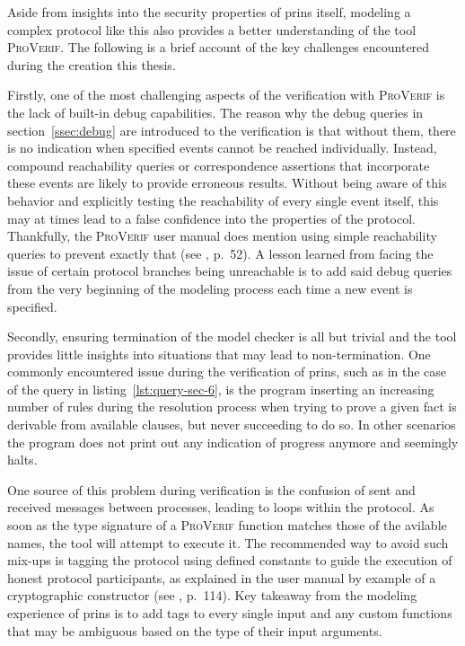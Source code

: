 Aside from insights into the security properties of \gls{prins} itself, modeling a complex protocol like this also provides a better understanding of the tool \textsc{ProVerif}.
The following is a brief account of the key challenges encountered during the creation this thesis.\medskip

Firstly, one of the most challenging aspects of the verification with \textsc{ProVerif} is the lack of built-in debug capabilities.
The reason why the debug queries in section~\ref{ssec:debug} are introduced to the verification is that without them, there is no indication when specified events cannot be reached individually.
Instead, compound reachability queries or correspondence assertions that incorporate these events are likely to provide erroneous results.
Without being aware of this behavior and explicitly testing the reachability of every single event itself, this may at times lead to a false confidence into the properties of the protocol.
Thankfully, the \textsc{ProVerif} user manual does mention using simple reachability queries to prevent exactly that (see \cite{blanchet2020proverif}, p.~52).
A lesson learned from facing the issue of certain protocol branches being unreachable is to add said debug queries from the very beginning of the modeling process each time a new event is specified.\medskip

Secondly, ensuring termination of the model checker is all but trivial and the tool provides little insights into situations that may lead to non-termination.
One commonly encountered issue during the verification of \gls{prins}, such as in the case of the query in listing~\ref{lst:query-sec-6}, is the program inserting an increasing number of rules during the resolution process when trying to prove a given fact is derivable from available clauses, but never succeeding to do so.
In other scenarios the program does not print out any indication of progress anymore and seemingly halts.

One source of this problem during verification is the confusion of sent and received messages between processes, leading to loops within the protocol.
As soon as the type signature of a \textsc{ProVerif} function matches those of the avilable names, the tool will attempt to execute it.
The recommended way to avoid such mix-ups is tagging the protocol using defined constants to guide the execution of honest protocol participants, as explained in the user manual by example of a cryptographic constructor (see \cite{blanchet2020proverif}, p.~114).
Key takeaway from the modeling experience of \gls{prins} is to add tags to every single input and any custom functions that may be ambiguous based on the type of their input arguments.

